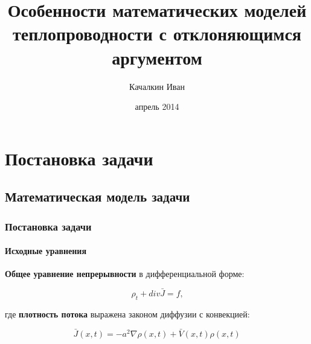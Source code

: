 \documentclass{beamer}
\numberwithin{equation}{section}
\begin{document}
    
    \title{Особенности математических моделей теплопроводности с отклоняющимся аргументом}
    
    \author{Качалкин Иван}
    
    
    \date{апрель 2014}

    {
        \frame{\titlepage}
    }

    \section{Постановка задачи}
    \subsection{Математическая модель задачи}
    \begin{frame}
        \frametitle{Постановка задачи}
        \framesubtitle{Исходные уравнения}

        \textbf{Общее уравнение непрерывности} в дифференциальной форме:

        \begin{equation}
            \rho_t + div \bar{J} = f \text{,}
        \end{equation}

        где \textbf{плотность потока} выражена законом диффузии с конвекцией:

        \begin{equation}
            \bar{J}(x,t) = -a^2 \nabla \rho(x,t) + \bar{V}(x,t) \rho(x,t)
        \end{equation}

    \end{frame}
\end{document}
